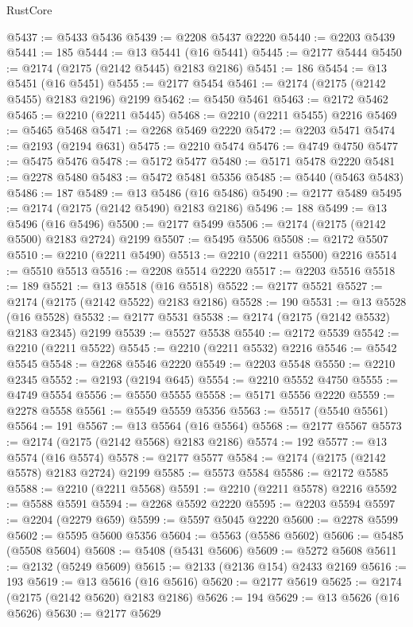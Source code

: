 \begin{lexlean}{RustCore}
\begin{coremodule}
@5437 := @5433 @5436
@5439 := @2208 @5437 @2220
@5440 := @2203 @5439
@5441 := 185
@5444 := @13 @5441 (@16 @5441)
@5445 := @2177 @5444
@5450 := @2174 (@2175 (@2142 @5445) @2183 @2186)
@5451 := 186
@5454 := @13 @5451 (@16 @5451)
@5455 := @2177 @5454
@5461 := @2174 (@2175 (@2142 @5455) @2183 @2196) @2199
@5462 := @5450 @5461
@5463 := @2172 @5462
@5465 := @2210 (@2211 @5445)
@5468 := @2210 (@2211 @5455) @2216
@5469 := @5465 @5468
@5471 := @2268 @5469 @2220
@5472 := @2203 @5471
@5474 := @2193 (@2194 @631)
@5475 := @2210 @5474
@5476 := @4749 @4750
@5477 := @5475 @5476
@5478 := @5172 @5477
@5480 := @5171 @5478 @2220
@5481 := @2278 @5480
@5483 := @5472 @5481 @5356
@5485 := @5440 (@5463 @5483)
@5486 := 187
@5489 := @13 @5486 (@16 @5486)
@5490 := @2177 @5489
@5495 := @2174 (@2175 (@2142 @5490) @2183 @2186)
@5496 := 188
@5499 := @13 @5496 (@16 @5496)
@5500 := @2177 @5499
@5506 := @2174 (@2175 (@2142 @5500) @2183 @2724) @2199
@5507 := @5495 @5506
@5508 := @2172 @5507
@5510 := @2210 (@2211 @5490)
@5513 := @2210 (@2211 @5500) @2216
@5514 := @5510 @5513
@5516 := @2208 @5514 @2220
@5517 := @2203 @5516
@5518 := 189
@5521 := @13 @5518 (@16 @5518)
@5522 := @2177 @5521
@5527 := @2174 (@2175 (@2142 @5522) @2183 @2186)
@5528 := 190
@5531 := @13 @5528 (@16 @5528)
@5532 := @2177 @5531
@5538 := @2174 (@2175 (@2142 @5532) @2183 @2345) @2199
@5539 := @5527 @5538
@5540 := @2172 @5539
@5542 := @2210 (@2211 @5522)
@5545 := @2210 (@2211 @5532) @2216
@5546 := @5542 @5545
@5548 := @2268 @5546 @2220
@5549 := @2203 @5548
@5550 := @2210 @2345
@5552 := @2193 (@2194 @645)
@5554 := @2210 @5552 @4750
@5555 := @4749 @5554
@5556 := @5550 @5555
@5558 := @5171 @5556 @2220
@5559 := @2278 @5558
@5561 := @5549 @5559 @5356
@5563 := @5517 (@5540 @5561)
@5564 := 191
@5567 := @13 @5564 (@16 @5564)
@5568 := @2177 @5567
@5573 := @2174 (@2175 (@2142 @5568) @2183 @2186)
@5574 := 192
@5577 := @13 @5574 (@16 @5574)
@5578 := @2177 @5577
@5584 := @2174 (@2175 (@2142 @5578) @2183 @2724) @2199
@5585 := @5573 @5584
@5586 := @2172 @5585
@5588 := @2210 (@2211 @5568)
@5591 := @2210 (@2211 @5578) @2216
@5592 := @5588 @5591
@5594 := @2268 @5592 @2220
@5595 := @2203 @5594
@5597 := @2204 (@2279 @659)
@5599 := @5597 @5045 @2220
@5600 := @2278 @5599
@5602 := @5595 @5600 @5356
@5604 := @5563 (@5586 @5602)
@5606 := @5485 (@5508 @5604)
@5608 := @5408 (@5431 @5606)
@5609 := @5272 @5608
@5611 := @2132 (@5249 @5609)
@5615 := @2133 (@2136 @154) @2433 @2169
@5616 := 193
@5619 := @13 @5616 (@16 @5616)
@5620 := @2177 @5619
@5625 := @2174 (@2175 (@2142 @5620) @2183 @2186)
@5626 := 194
@5629 := @13 @5626 (@16 @5626)
@5630 := @2177 @5629

\end{coremodule}
\end{lexlean}
